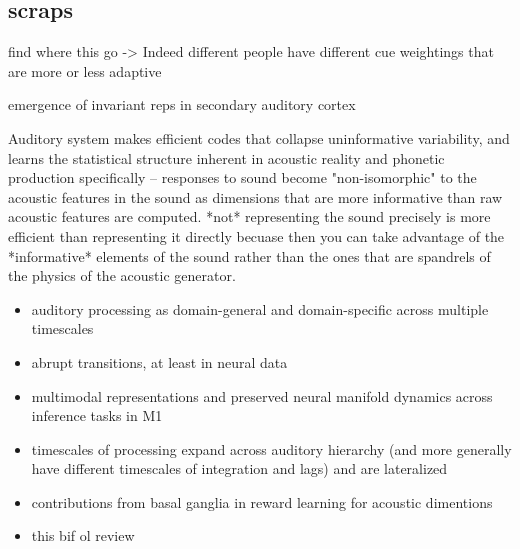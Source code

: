 

\subsection{scraps}

 find where this go -> Indeed different people have different cue weightings that are more or less adaptive\cite{clayardsDifferencesCueWeights2018}

emergence of invariant reps in secondary auditory cortex\cite{carruthersEmergenceInvariantRepresentation2015c}


Auditory system makes efficient codes that collapse uninformative variability, and learns the statistical structure inherent in acoustic reality \cite{schiavoCapacitiesNeuralMechanisms2019} and phonetic production specifically\cite{kuhlNewViewLanguage2000} -- responses to sound become "non-isomorphic" to the acoustic features in the sound \cite{stilpEfficientCodingStatistically2012,wangNeuralCodingStrategies2007} as dimensions that are more informative than raw acoustic features are computed. *not* representing the sound precisely is more efficient than representing it directly becuase then you can take advantage of the *informative* elements of the sound rather than the ones that are spandrels of the physics of the acoustic generator.


\begin{itemize}
\item auditory processing as domain-general and domain-specific across multiple timescales \cite{norman-haignereHierarchicalIntegrationMultiple2020}
\item abrupt transitions, at least in neural data \cite{durstewitzAbruptTransitionsPrefrontal2010}
\item multimodal representations and preserved neural manifold dynamics across inference tasks in M1 \cite{gallegoCorticalPopulationActivity2018}
\item timescales of processing expand across auditory hierarchy (and more generally have different timescales of integration and lags) \cite{norman-haignereHierarchicalIntegrationMultiple2020} and are lateralized \cite{levyCircuitAsymmetriesUnderlie2019a}
\item contributions from basal ganglia in reward learning for acoustic dimentions \cite{limHowMayBasal2014}
\item this bif ol review \cite{rauscheckerMapsStreamsAuditory2009b}
\end{itemize}



